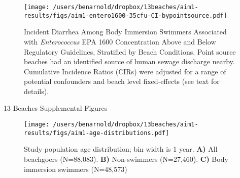 \documentclass[11pt]{article}
\begin{document}
\begin{figure}[htbp]
\begin{center}
\texttt{[image: /users/benarnold/dropbox/13beaches/aim1-results/figs/aim1-entero1600-35cfu-CI-bypointsource.pdf]} 
\begin{minipage}{\textwidth}
\caption{Incident Diarrhea Among Body Immersion Swimmers Associated with \textit{Enterococcus} EPA 1600 Concentration Above and Below Regulatory Guidelines, Stratified by Beach Conditions. Point source beaches had an identified source of human sewage discharge nearby. Cumulative Incidence Ratios (CIRs) were adjusted for a range of potential confounders and beach level fixed-effects (see text for details).}
\label{fig:enteroregulatory}
\end{minipage}
\end{center}
\end{figure}


\clearpage
{\centerline {\LARGE 13 Beaches Supplemental Figures} }

\renewcommand{\thefigure}{S\arabic{figure}}

\setcounter{figure}{0}





\clearpage
\begin{figure}[htbp]
\begin{center}
\texttt{[image: /users/benarnold/dropbox/13beaches/aim1-results/figs/aim1-age-distributions.pdf]}
\begin{minipage}{0.7\textwidth}
\caption{Study population age distribution; bin width is 1 year. \textbf{A)} All beachgoers (N=88,083). \textbf{B)} Non-swimmers (N=27,460).  \textbf{C)} Body immersion swimmers (N=48,573)}
\label{fig:agedist}
\end{minipage}
\end{center}
\end{figure}
\end{document}
